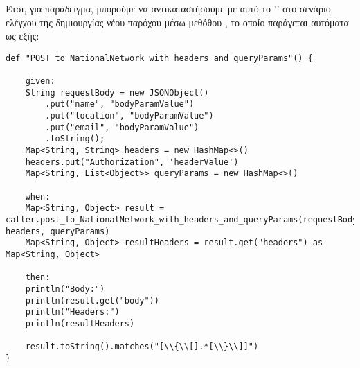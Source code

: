 \begin{itemize}
    Έτσι, για παράδειγμα, μπορούμε να αντικαταστήσουμε με αυτό το '' στο σενάριο ελέγχου της δημιουργίας 
    νέου παρόχου μέσω μεθόθου , το οποίο παράγεται αυτόματα ως εξής:

    \begin{lstlisting}[deletekeywords={body}]
def "POST to NationalNetwork with headers and queryParams"() {

    given:
    String requestBody = new JSONObject()
        .put("name", "bodyParamValue")
        .put("location", "bodyParamValue")
        .put("email", "bodyParamValue")
        .toString();
    Map<String, String> headers = new HashMap<>()
    headers.put("Authorization", 'headerValue')
    Map<String, List<Object>> queryParams = new HashMap<>()

    when:
    Map<String, Object> result = caller.post_to_NationalNetwork_with_headers_and_queryParams(requestBody, headers, queryParams)
    Map<String, Object> resultHeaders = result.get("headers") as Map<String, Object>

    then:
    println("Body:")
    println(result.get("body"))
    println("Headers:")
    println(resultHeaders)

    result.toString().matches("[\\{\\[].*[\\}\\]]")
}
\end{lstlisting}
    
\end{itemize}